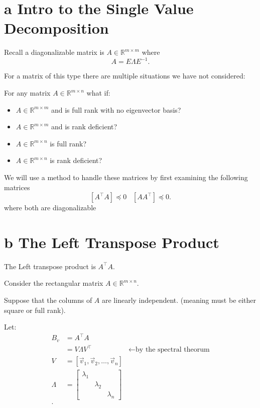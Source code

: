 \documentclass[12pt]{book}
\title{\coursetitle\linebreak\lecturename}
\author{\\Cain Susko\\ 
           \\ \\ \\
      Queen's University 
    \\School of Computing\\}
\begin{document}
\begin{titlepage}
        \maketitle
\end{titlepage}


\section*{a Intro to the Single Value Decomposition}
Recall a diagonalizable matrix is $A\in\mathbb{R}^{m\times m}$ where
\[
A = E\Lambda E^{-1}
.\] 

For a matrix of this type there are multiple situations we have not considered:

For any matrix $A\in\mathbb{R}^{m\times n}$ what if:
\begin{itemize}
        \item $A\in\mathbb{R}^{m\times m}$ and is full rank with no eigenvector basis?
        \item $A\in\mathbb{R}^{m\times m}$ and is rank deficient?
        \item $A\in\mathbb{R}^{m\times n}$ is full rank? 
        \item $A\in\mathbb{R}^{m\times n}$ is rank deficient?
\end{itemize}

We will use a method to handle these matrices by first examining the following matrices
\[
[A^\top A]\preceq 0\;\;\; [A A^\top]\preceq 0
.\] 
where both are diagonalizable 
\pagebreak

\section*{b The Left Transpose Product}
The Left transpose product is $A^\top A$.

Consider the rectangular matrix $A\in\mathbb{R}^{m\times n}$.

Suppose that the columns of $A$ are linearly independent. (meaning must be either square or full rank).

Let: 
\begin{align*}
        B_v &= A^\top A\\
            &= V\Lambda V^\top &\leftarrow\text{by the spectral theorum} \\
        V &= [\vec v_1,  \vec v_2, \ldots, \vec v_n]\\
        \Lambda &= \begin{bmatrix} \lambda_1  & & \\ & \lambda_2 & \\ & & \lambda_n \end{bmatrix}  \\
.\end{align*}
\end{document}
